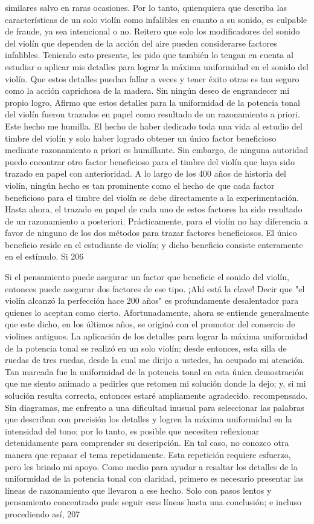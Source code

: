 similares salvo en raras ocasiones.
Por lo tanto, quienquiera que describa las características de un solo violín como infalibles en cuanto a su sonido, es culpable de fraude, ya sea intencional o no. Reitero que solo los modificadores del sonido del violín que dependen de la acción del aire pueden considerarse factores infalibles.
Teniendo esto presente, les pido que también lo tengan en cuenta al estudiar o aplicar mis detalles para lograr la máxima uniformidad en el sonido del violín. Que estos detalles puedan fallar a veces y tener éxito otras es tan seguro como la acción caprichosa de la madera. Sin ningún deseo de engrandecer mi propio logro,
Afirmo que estos detalles para la uniformidad de la potencia tonal del violín fueron trazados en papel como resultado de un razonamiento a priori. Este hecho me humilla. El hecho de haber dedicado toda una vida al estudio del timbre del violín y solo haber logrado obtener un único factor beneficioso mediante razonamiento a priori es humillante. Sin embargo, de ninguna autoridad puedo encontrar otro factor beneficioso para el timbre del violín que haya sido trazado en papel con anterioridad. A lo largo de los 400 años de historia del violín, ningún hecho es tan prominente como el hecho de que cada factor beneficioso para el timbre del violín se debe directamente a la experimentación. Hasta ahora, el trazado en papel de cada uno de estos factores ha sido resultado de un razonamiento a posteriori. Prácticamente, para el violín no hay diferencia a favor de ninguno de los dos métodos para trazar factores beneficiosos. El único beneficio reside en el estudiante de violín; y dicho beneficio consiste enteramente en el estímulo. Si
206

Si el pensamiento puede asegurar un factor que beneficie el sonido del violín, entonces puede asegurar dos factores de ese tipo. ¡Ahí está la clave! Decir que "el violín alcanzó la perfección hace 200 años" es profundamente desalentador para quienes lo aceptan como cierto. Afortunadamente, ahora se entiende generalmente que este dicho, en los últimos años, se originó con el promotor del comercio de violines antiguos.
La aplicación de los detalles para lograr la máxima uniformidad de la potencia tonal se realizó en un solo violín; desde entonces, esta silla de ruedas de tres ruedas, desde la cual me dirijo a ustedes, ha ocupado mi atención. Tan marcada fue la uniformidad de la potencia tonal en esta única demostración que me siento animado a pedirles que retomen mi solución donde la dejo; y, si mi solución resulta correcta, entonces estaré ampliamente agradecido.
recompensado.
Sin diagramas, me enfrento a una dificultad inusual para seleccionar las palabras que describan con precisión los detalles y logren la máxima uniformidad en la intensidad del tono; por lo tanto, es posible que necesiten reflexionar detenidamente para comprender su descripción. En tal caso, no conozco otra manera que repasar el tema repetidamente. Esta repetición requiere esfuerzo, pero les brindo mi apoyo.
Como medio para ayudar a resaltar los detalles de la uniformidad de la potencia tonal con claridad, primero es necesario presentar las líneas de razonamiento que llevaron a ese hecho. Solo con pasos lentos y pensamiento concentrado pude seguir esas líneas hasta una conclusión; e incluso procediendo así,
207

